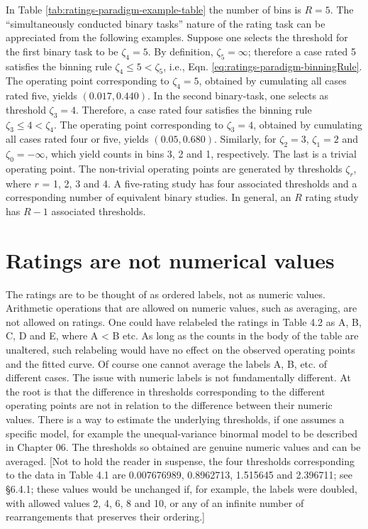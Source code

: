 \documentclass[
]{book}
\begin{document}
In Table \ref{tab:ratings-paradigm-example-table} the number of bins is \(R = 5\). The ``simultaneously conducted binary tasks'' nature of the rating task can be appreciated from the following examples. Suppose one selects the threshold for the first binary task to be \(\zeta_4 = 5\). By definition, \(\zeta_5 = \infty\); therefore a case rated 5 satisfies the binning rule \(\zeta_4 \leq 5 < \zeta_5\), i.e., Eqn. \eqref{eq:ratings-paradigm-binningRule}. The operating point corresponding to \(\zeta_4 = 5\), obtained by cumulating all cases rated five, yields \((0.017, 0.440)\). In the second binary-task, one selects as threshold \(\zeta_3 = 4\). Therefore, a case rated four satisfies the binning rule \(\zeta_3 \leq 4 < \zeta_4\). The operating point corresponding to \(\zeta_3 = 4\), obtained by cumulating all cases rated four or five, yields \((0.05, 0.680)\). Similarly, for \(\zeta_2 = 3\), \(\zeta_1 = 2\) and \(\zeta_0 = -\infty\), which yield counts in bins 3, 2 and 1, respectively. The last is a trivial operating point. The non-trivial operating points are generated by thresholds \(\zeta_r\), where \(r\) = 1, 2, 3 and 4. A five-rating study has four associated thresholds and a corresponding number of equivalent binary studies. In general, an \(R\) rating study has \(R-1\) associated thresholds.

\hypertarget{binary-task-ratings-not-numerical-values}{%
\section{Ratings are not numerical values}\label{binary-task-ratings-not-numerical-values}}

The ratings are to be thought of as ordered labels, not as numeric values. Arithmetic operations that are allowed on numeric values, such as averaging, are not allowed on ratings. One could have relabeled the ratings in Table 4.2 as A, B, C, D and E, where A \textless{} B etc. As long as the counts in the body of the table are unaltered, such relabeling would have no effect on the observed operating points and the fitted curve. Of course one cannot average the labels A, B, etc. of different cases. The issue with numeric labels is not fundamentally different. At the root is that the difference in thresholds corresponding to the different operating points are not in relation to the difference between their numeric values. There is a way to estimate the underlying thresholds, if one assumes a specific model, for example the unequal-variance binormal model to be described in Chapter 06. The thresholds so obtained are genuine numeric values and can be averaged. {[}Not to hold the reader in suspense, the four thresholds corresponding to the data in Table 4.1 are 0.007676989, 0.8962713, 1.515645 and 2.396711; see §6.4.1; these values would be unchanged if, for example, the labels were doubled, with allowed values 2, 4, 6, 8 and 10, or any of an infinite number of rearrangements that preserves their ordering.{]}
\end{document}
